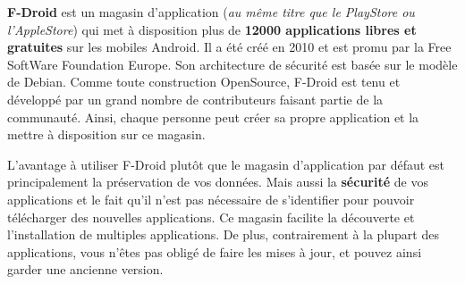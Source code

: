 \textbf{F-Droid} est un magasin d'application (\textit{au même titre que le PlayStore ou l'AppleStore}) qui met à disposition plus
de \textbf{12000 applications libres et gratuites} sur les mobiles Android.
Il a été créé en 2010 et est promu par la Free SoftWare Foundation Europe. Son architecture de sécurité est basée sur le modèle de Debian.
Comme toute construction OpenSource, F-Droid est tenu et développé par un grand nombre de contributeurs faisant partie de la communauté.
Ainsi, chaque personne peut créer sa propre application et la mettre à disposition sur ce magasin.

L’avantage à utiliser F-Droid plutôt que le magasin d'application par défaut est principalement la préservation de vos données.
Mais aussi la \textbf{sécurité} de vos applications et le fait qu'il n'est pas nécessaire de s'identifier pour pouvoir télécharger
 des nouvelles applications.
Ce magasin facilite la découverte et l'installation de multiples applications. De plus, contrairement à la plupart des applications,
 vous n’êtes pas obligé de faire les mises à jour, et pouvez ainsi garder une ancienne version. 
